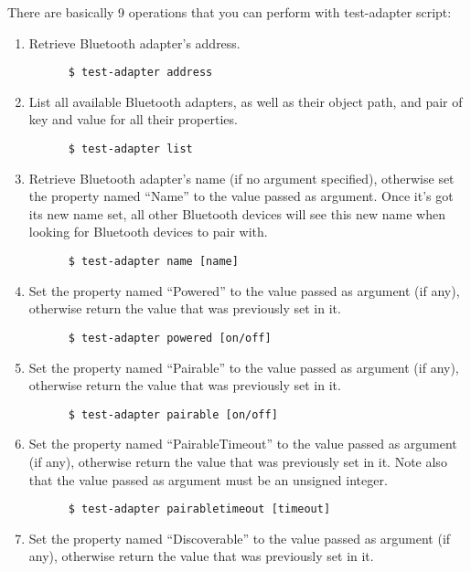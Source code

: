 \documentclass[11pt]{article}
\begin{document}
There are basically 9 operations that you can perform with
test-adapter script:
\begin{enumerate}
  \item Retrieve Bluetooth adapter's address.
    \begin{verbatim}
      $ test-adapter address
    \end{verbatim}
  \item List all available Bluetooth adapters, as well as their object
        path, and pair of key and value for all their properties.
    \begin{verbatim}
      $ test-adapter list
    \end{verbatim}
  \item Retrieve Bluetooth adapter's name (if no argument specified),
        otherwise set the property named ``Name'' to the value passed
        as argument. Once it's got its new name set, all other
        Bluetooth devices will see this new name when looking for
        Bluetooth devices to pair with.
    \begin{verbatim}
      $ test-adapter name [name]
    \end{verbatim}
  \item Set the property named ``Powered'' to the value passed as
        argument (if any), otherwise return the value that was
        previously set in it.
    \begin{verbatim}
      $ test-adapter powered [on/off]
    \end{verbatim}
  \item Set the property named ``Pairable'' to the value passed as
        argument (if any), otherwise return the value that was
        previously set in it.
    \begin{verbatim}
      $ test-adapter pairable [on/off]
    \end{verbatim}
  \item Set the property named ``PairableTimeout'' to the value passed
        as argument (if any), otherwise return the value that was
        previously set in it. Note also that the value passed as
        argument must be an unsigned integer.
    \begin{verbatim}
      $ test-adapter pairabletimeout [timeout]
    \end{verbatim}
  \item Set the property named ``Discoverable'' to the value passed as
        argument (if any), otherwise return the value that was
        previously set in it.
    \begin{verbatim}

\end{verbatim}
\end{enumerate}
\end{document}
